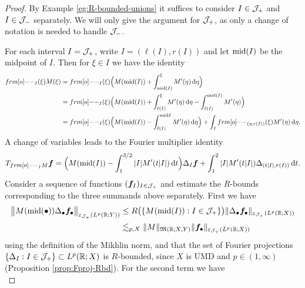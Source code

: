 \begin{proof}
  By Example \ref{eg:R-bounded-unions} it suffices to consider $I \in \mathcal{J}_{+}$ and $I \in \mathcal{J}_{-}$ separately.
  We will only give the argument for $\mathcal{J}_{+}$, as only a change of notation is needed to handle $\mathcal{J}_{-}$.

  For each interval $I = \mathcal{J}_{+}$, write $I = (\ell(I), r(I))$ and let $\mathrm{mid}(I)$ be the midpoint of $I$.
  Then for $\xi \in I$ we have the identity
  \begin{equation*}
    \begin{aligned}
      \1_{I}(\xi)M(\xi)
      &= \1_{I}(\xi) \Big( M(\midp(I)) + \int_{\midp(I)}^{\xi} M'(\eta) \, \dd\eta \Big) \\
      &= \1_{I}(\xi) \Big( M(\midp(I)) + \int_{\ell(I)}^{\xi} M'(\eta) \, \dd\eta - \int_{\ell(I)}^{\midp(I)} M'(\eta) \Big) \\
      &= \1_{I}(\xi) \Big( M(\midp(I)) - \int_{\ell(I)}^{\midp{I}} M'(\eta) \, \dd\eta \Big) + \int_{I} \1_{(\eta,r(I))}(\xi) M'(\eta) \, \dd\eta.
    \end{aligned}
  \end{equation*}
  A change of variables leads to the Fourier multiplier identity
  \begin{equation*}
    T_{\1_I M} \mb{f}
    = \Big( M(\midp(I)) - \int_{1}^{3/2} |I| M'(t|I|) \, \dd t \Big)\Delta_{I} \mb{f} + \int_{1}^{2} |I| M'(t|I|) \Delta_{(t|I|,r(I))} \, \dd t.
  \end{equation*}
  Consider a sequence of functions $(\bm{f}_{I})_{I \in \mathcal{J}_{+}}$ and estimate the $R$-bounds corresponding to the three summands above separately.
  First we have
  \begin{equation*}
    \begin{aligned}
      \big\|M(\mathrm{mid}(\bullet)) \Delta_{\bullet} \bm{f}_{\bullet} \big\|_{\varepsilon_{\mathcal{J}_{+}}(L^p(\mathbb{R};Y))}
      &\leq R\big( \{M(\mathrm{mid}(I)) : I \in \mathcal{J}_{+} \} \big) \|\Delta_{\bullet} \bm{f}_{\bullet} \|_{\varepsilon_{\mathcal{J}_{+}}(L^p(\mathbb{R};X))} \\
      &\lesssim_{p,X} \|M\|_{\mathfrak{M}(\mathbb{R};X,Y)} \| \bm{f}_{\bullet} \|_{\varepsilon_{\mathcal{J}_{+}}(L^p(\mathbb{R};X))} 
  \end{aligned}
\end{equation*}
using the definition of the Mikhlin norm, and that the set of Fourier projections $\{\Delta_{I} : I \in \mathcal{J}_{+}\} \subset L^p(\mathbb{R};X)$ is $R$-bounded, since $X$ is UMD and $p \in (1,\infty)$ (Proposition \ref{prop:Fproj-Rbd}).
For the second term we have
\begin{equation*}

\end{equation*}
\end{proof}

